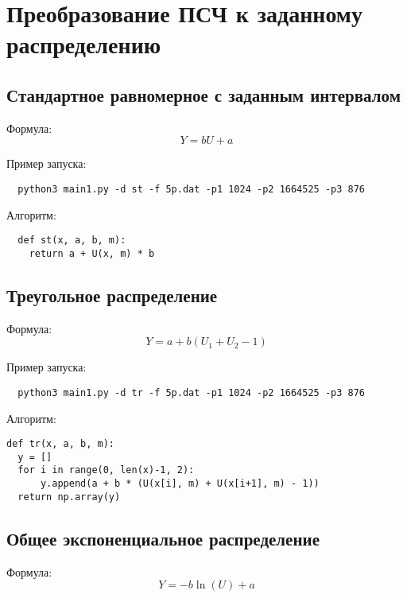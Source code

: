 \documentclass[spec, och, labwork]{shiza}
\begin{document}
\section{Преобразование ПСЧ к заданному распределению}
\subsection{Стандартное равномерное с заданным интервалом}

Формула: \[ Y = bU + a \]

Пример запуска:
\begin{small}
\begin{verbatim}
  python3 main1.py -d st -f 5p.dat -p1 1024 -p2 1664525 -p3 876 
 \end{verbatim}
\end{small}

Алгоритм:
\begin{small}
\begin{verbatim}
  def st(x, a, b, m):
    return a + U(x, m) * b
\end{verbatim}
\end{small}


\subsection{Треугольное распределение}

Формула:
\[ Y = a + b(U_1 + U_2 - 1) \]

Пример запуска:
\begin{small}
\begin{verbatim} 
  python3 main1.py -d tr -f 5p.dat -p1 1024 -p2 1664525 -p3 876  

 \end{verbatim}
\end{small}

Алгоритм:
\begin{small}
\begin{verbatim}
def tr(x, a, b, m):
  y = []
  for i in range(0, len(x)-1, 2):
      y.append(a + b * (U(x[i], m) + U(x[i+1], m) - 1))
  return np.array(y)
\end{verbatim}
\end{small}


\subsection{Общее экспоненциальное распределение}

Формула:
\[ Y = -b \ln(U) + a \]
\end{document}
